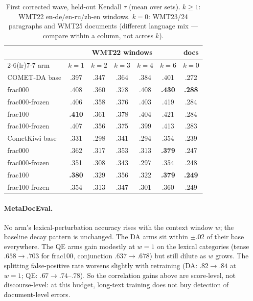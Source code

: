\documentclass[11pt]{article}
\begin{document}
\begin{table}[t]
\centering\small
\begin{tabular}{l ccccc c}
\toprule
& \multicolumn{5}{c}{WMT22 windows} & docs\\
\cmidrule(lr){2-6}\cmidrule(lr){7-7}
arm & $k{=}1$ & $k{=}2$ & $k{=}3$ & $k{=}4$ & $k{=}6$ & $k{=}0$\\
\midrule
COMET-DA base        & .397 & .347 & .364 & .384 & .401 & .272\\
\;frac000            & .408 & .360 & .378 & .408 & \textbf{.430} & \textbf{.288}\\
\;frac000-frozen     & .406 & .358 & .376 & .403 & .419 & .284\\
\;frac100            & \textbf{.410} & .361 & .378 & .404 & .421 & .284\\
\;frac100-frozen     & .407 & .356 & .375 & .399 & .413 & .283\\
\midrule
CometKiwi base       & .331 & .298 & .341 & .294 & .354 & .239\\
\;frac000            & .362 & .317 & .353 & .313 & \textbf{.379} & .247\\
\;frac000-frozen     & .351 & .308 & .343 & .297 & .354 & .248\\
\;frac100            & \textbf{.380} & .329 & .356 & .322 & \textbf{.379} & \textbf{.249}\\
\;frac100-frozen     & .354 & .313 & .347 & .301 & .360 & .249\\
\bottomrule
\end{tabular}
\caption{First corrected wave, held-out Kendall $\tau$ (mean over sets). $k \ge 1$: WMT22 en-de/en-ru/zh-en windows. $k{=}0$: WMT23/24 paragraphs and WMT25 documents (different language mix --- compare within a column, not across $k$).}
\label{tab:wave1}
\end{table}

\paragraph{MetaDocEval.}
No arm's lexical-perturbation accuracy rises with the context window $w$; the baseline decay pattern is unchanged.
The DA arms sit within $\pm .02$ of their base everywhere.
The QE arms gain modestly at $w{=}1$ on the lexical categories (tense $.658 \to .703$ for frac100, conjunction $.637 \to .678$) but still dilute as $w$ grows.
The splitting false-positive rate worsens slightly with retraining (DA: $.82 \to .84$ at $w{=}1$; QE: $.67 \to .74$--$.78$).
So the correlation gains above are score-level, not discourse-level: at this budget, long-text training does not buy detection of document-level errors.
\end{document}
